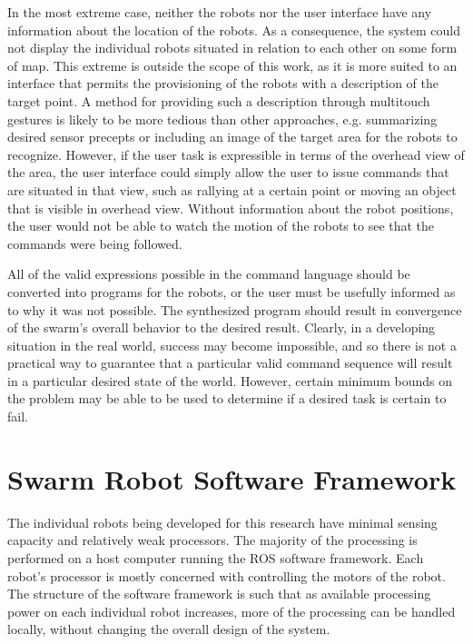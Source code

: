 In the most extreme case, neither the robots nor the user interface have any information about the location of the robots. 
As a consequence, the system could not display the individual robots situated in relation to each other on some form of map. 
This extreme is outside the scope of this work, as it is more suited to an interface that permits the provisioning of the robots with a description of the target point. 
A method for providing such a description through multitouch gestures is likely to be more tedious than other approaches, e.g. summarizing desired sensor precepts or including an image of the target area for the robots to recognize. 
However, if the user task is expressible in terms of the overhead view of the area, the user interface could simply allow the user to issue commands that are situated in that view, such as rallying at a certain point or moving an object that is visible in overhead view. 
Without information about the robot positions, the user would not be able to watch the motion of the robots to see that the commands were being followed. 

All of the valid expressions possible in the command language should be converted into programs for the robots, or the user must be usefully informed as to why it was not possible. 
The synthesized program should result in convergence of the swarm's overall behavior to the desired result. 
Clearly, in a developing situation in the real world, success may become impossible, and so there is not a practical way to guarantee that a particular valid command sequence will result in a particular desired state of the world. 
However, certain minimum bounds on the problem may be able to be used to determine if a desired task is certain to fail. 

\section{Swarm Robot Software Framework}

The individual robots being developed for this research have minimal sensing capacity and relatively weak processors. 
The majority of the processing is performed on a host computer running the ROS software framework. 
Each robot's processor is mostly concerned with controlling the motors of the robot. 
The structure of the software framework is such that as available processing power on each individual robot increases, more of the processing can be handled locally, without changing the overall design of the system.

